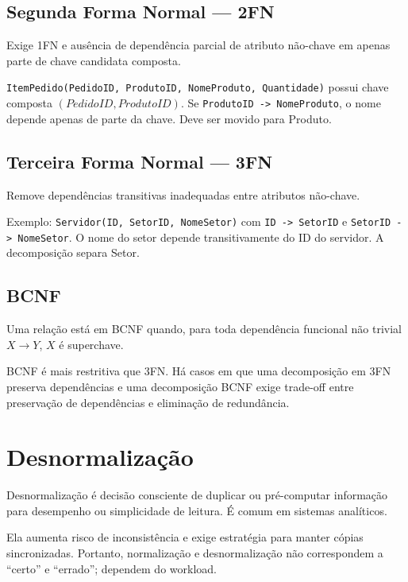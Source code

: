 \subsection{Segunda Forma Normal — 2FN}

Exige 1FN e ausência de dependência parcial de atributo não-chave em apenas parte de chave candidata composta.

\begin{exemplo}[2FN]
\texttt{ItemPedido(PedidoID, ProdutoID, NomeProduto, Quantidade)} possui chave composta $(PedidoID,ProdutoID)$. Se \texttt{ProdutoID -> NomeProduto}, o nome depende apenas de parte da chave. Deve ser movido para Produto.
\end{exemplo}

\subsection{Terceira Forma Normal — 3FN}

Remove dependências transitivas inadequadas entre atributos não-chave.

Exemplo: \texttt{Servidor(ID, SetorID, NomeSetor)} com \texttt{ID -> SetorID} e \texttt{SetorID -> NomeSetor}. O nome do setor depende transitivamente do ID do servidor. A decomposição separa Setor.

\subsection{BCNF}

Uma relação está em BCNF quando, para toda dependência funcional não trivial $X\to Y$, $X$ é superchave.

BCNF é mais restritiva que 3FN. Há casos em que uma decomposição em 3FN preserva dependências e uma decomposição BCNF exige trade-off entre preservação de dependências e eliminação de redundância.

\section{Desnormalização}

Desnormalização é decisão consciente de duplicar ou pré-computar informação para desempenho ou simplicidade de leitura. É comum em sistemas analíticos.

Ela aumenta risco de inconsistência e exige estratégia para manter cópias sincronizadas. Portanto, normalização e desnormalização não correspondem a ``certo'' e ``errado''; dependem do workload.

